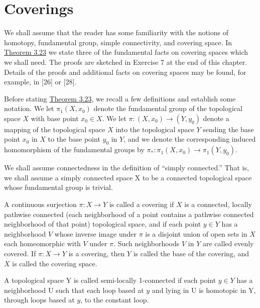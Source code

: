 \section{Coverings}

We shall assume that the reader has some familiarity with the notions of homotopy, fundamental group, simple connectivity, and covering space. In \hyperref[thm:3.23]{Theorem 3.23} we state three of the fundamental facts on covering spaces which we shall need. The proofs are sketched in Exercise 7 at the end of this chapter. Details of the proofs and additional facts on covering spaces may be found, for example, in [26] or [28].

\begin{definition}\label{thm:3.22}
Before stating \hyperref[thm:3.23]{Theorem 3.23}, we recall a few definitions and establish some notation. We let  $ \pi_1(X, x_0) $ denote the fundamental group of the topological space  $ X $ with base point  $ x_0 \in X $. We let  $ \pi \colon (X, x_0) \to (Y, y_0) $ denote a mapping of the topological space  $ X $ into the topological space  $ Y $ sending the base point  $ x_0 $ in  $ X $ to the base point  $ y_0 $ in  $ Y $, and we denote the corresponding induced homomorphism of the fundamental groups by  $ \pi_* \colon \pi_1(X, x_0) \to \pi_1(Y, y_0) $.

We shall assume connectedness in the definition of ``simply connected.'' That is, we shall assume a simply connected space X to be a connected topological space whose fundamental group is trivial. 

A continuous surjection $\pi: X \to Y$ is called a covering if $X$ is a connected, locally pathwise connected (each neighborhood of a point contains a pathwise connected neighborhood of that point) topological space, and if each point $y \in Y$ has a neighborhood $V$ whose inverse image under $\pi$ is a disjoint union of open sets in $X$ each homeomorphic with $V$ under $\pi$. Such neighborhoods $V$ in $Y$ are called evenly covered. If $\pi: X \to Y$ is a covering, then $Y$ is called the base of the covering, and $X$ is called the covering space.

A topological space Y is called semi-locally 1-connected if each point $y \in Y$ has a neighborhood U such that each loop based at $y$ and lying in U is homotopic in Y, through loops based at $y$, to the constant loop. 

\end{definition}

